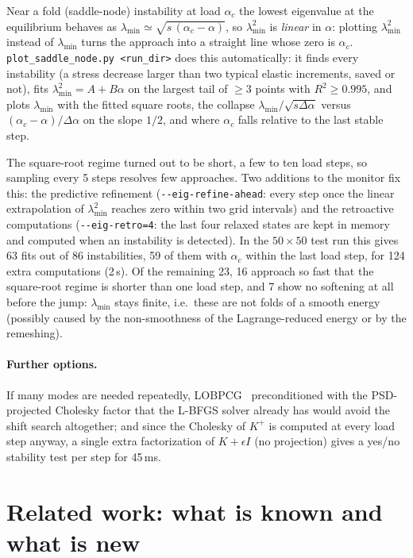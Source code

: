 \documentclass[11pt,a4paper]{article}
\theoremstyle{remark}
\newcommand{\code}[1]{\texttt{#1}}
\begin{document}
Near a fold (saddle-node) instability at load $\alpha_c$ the lowest eigenvalue at the equilibrium
behaves as $\lambda_{\min}\simeq\sqrt{s\,(\alpha_c-\alpha)}$, so $\lambda_{\min}^2$ is \emph{linear} in
$\alpha$: plotting $\lambda_{\min}^2$ instead of $\lambda_{\min}$ turns the approach into a straight line
whose zero is $\alpha_c$. \code{plot\_\allowbreak{}saddle\_\allowbreak{}node.py <run\_dir>} does this automatically: it finds
every instability (a stress decrease larger than two typical elastic increments, saved or
not), fits $\lambda_{\min}^2=A+B\alpha$ on the largest tail of $\ge3$ points with $R^2\ge0.995$, and
plots $\lambda_{\min}$ with the fitted square roots, the collapse
$\lambda_{\min}/\sqrt{s\Delta\alpha}$ versus $(\alpha_c-\alpha)/\Delta\alpha$ on the slope $1/2$, and where
$\alpha_c$ falls relative to the last stable step.

The square-root regime turned out to be short, a few to ten load steps, so sampling every
5 steps resolves few approaches. Two additions to the monitor fix this: the predictive
refinement (\code{-{}-eig-refine-ahead}: every step once the linear extrapolation of $\lambda_{\min}^2$
reaches zero within two grid intervals) and the retroactive computations
(\code{-{}-eig-retro=4}: the last four relaxed states are kept in memory and computed when an
instability is detected). In the $50\times50$ test run this gives 63 fits out of 86
instabilities, 59 of them with $\alpha_c$ within the last load step, for 124 extra
computations (2\,s). Of the remaining 23, 16 approach so fast that the square-root regime is
shorter than one load step, and 7 show no softening at all before the jump: $\lambda_{\min}$ stays
finite, i.e.\ these are not folds of a smooth energy (possibly caused by the non-smoothness of
the Lagrange-reduced energy or by the remeshing).

\paragraph{Further options.} If many modes are needed repeatedly, LOBPCG~\cite{knyazev2001}
preconditioned with the PSD-projected Cholesky factor that the L-BFGS solver already has would
avoid the shift search altogether; and since the Cholesky of $K^+$ is computed at every load step
anyway, a single extra factorization of $K+\epsilon I$ (no projection) gives a yes/no stability test
per step for 45\,ms.

\section{Related work: what is known and what is new}
\label{sec:literature}
\end{document}
